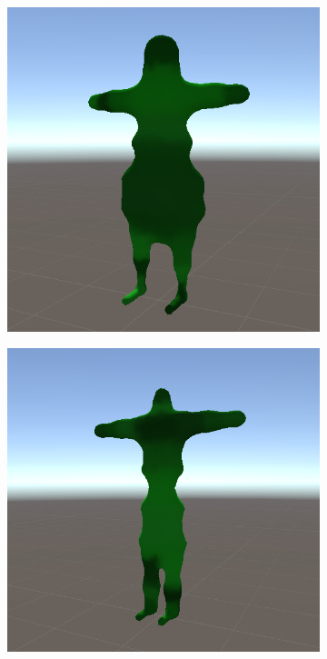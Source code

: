 \begin{figure}[ht]
\begin{subfigure}[b]{0.2\textwidth}
    \end{subfigure}
    \begin{subfigure}[b]{0.2\textwidth}
        \centering
        \includegraphics[width=\textwidth, height=\textwidth]{resources/img/Finished_Creatures_2/creature_6}
    \end{subfigure}
    \begin{subfigure}[b]{0.2\textwidth}
        \centering
        \includegraphics[width=\textwidth, height=\textwidth]{resources/img/Finished_Creatures_2/creature_7}

\end{subfigure}
\end{figure}
